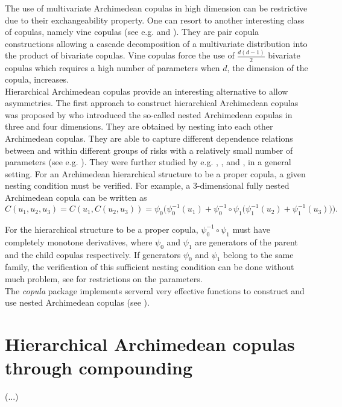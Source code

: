 \documentclass[11pt, english]{article}\usepackage[]{graphicx}\usepackage[]{color}
\begin{document}
The use of multivariate Archimedean copulas in high dimension can be
restrictive due to their exchangeability property. One can resort to
another interesting class of copulas, namely vine copulas (see e.g. \cite{bedford2002} and \cite{joe1997}). They are pair copula constructions
allowing a cascade decomposition of a multivariate distribution into the
product of bivariate copulas. Vine copulas force the use of $\frac{d(d-1)}{2%
}$ bivariate copulas which requires a high number of parameters when $d$,
the dimension of the copula, increases. \\


Hierarchical Archimedean copulas provide an interesting alternative to allow asymmetries.
The first approach to construct hierarchical Archimedean copulas was proposed by \cite{joe1997} who introduced the so-called nested Archimedean copulas in three and four dimensions. They
are obtained by nesting into each other Archimedean copulas.
They are able to capture different dependence relations between and within different
groups of risks with a relatively small number of parameters (see e.g. \cite{gorecki2016}). They were further studied by e.g. \cite{mcsample08}, \cite{hofert12eff}, and \cite{hofert11eff}, in a general setting.  For an Archimedean hierarchical structure to be a
proper copula, a given nesting condition must be verified. For example, a
3-dimensional fully nested Archimedean copula can be written as
\begin{equation*}
C(u_{1},u_{2},u_{3})=C(u_{1},C(u_{2},u_{3}))=\psi _{0}\Big(\psi
_{0}^{-1}(u_{1})+\psi _{0}^{-1}\circ \psi _{1}\big(\psi
_{1}^{-1}(u_{2})+\psi _{1}^{-1}(u_{3})\big)\Big).
\end{equation*}

For the hierarchical structure to be a proper copula, $\psi _{0}^{-1}\circ
\psi _{1}$ must have completely monotone derivatives, where $\psi _{0}$ and $%
\psi _{1}$ are generators of the parent and the child copulas respectively.
If generators $\psi _{0}$ and $\psi _{1}$ belong to the same family, the
verification of this sufficient nesting condition can be done without much
problem, see \cite{hofert} for restrictions on the parameters. \\

The \emph{copula} package implements serveral very effective functions to construct and use nested Archimedean copulas (see \cite{hofert2011nested}).

\section{Hierarchical Archimedean copulas through compounding}

(...)


\newpage



\end{document}
